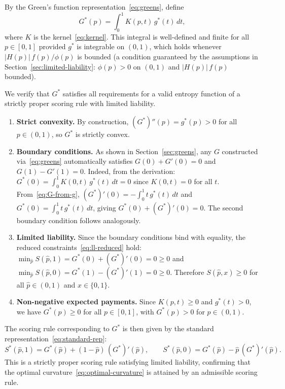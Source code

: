 \documentclass[11pt]{article}
\begin{document}
By the Green's function representation~\eqref{eq:greens}, define
\[
G^*(p) = \int_0^1 K(p,t)\,g^*(t)\,dt,
\]
where $K$ is the kernel~\eqref{eq:kernel}. This integral is well-defined and finite for all $p \in [0,1]$ provided $g^*$ is integrable on $(0,1)$, which holds whenever $|H(p)|\,f(p)/\phi(p)$ is bounded (a condition guaranteed by the assumptions in Section~\ref{sec:limited-liability}: $\phi(p) > 0$ on $(0,1)$ and $|H(p)|\,f(p)$ bounded).

We verify that $G^*$ satisfies all requirements for a valid entropy function of a strictly proper scoring rule with limited liability.

\begin{enumerate}
\item \textbf{Strict convexity.} By construction, $(G^*)''(p) = g^*(p) > 0$ for all $p \in (0,1)$, so $G^*$ is strictly convex.

\item \textbf{Boundary conditions.} As shown in Section~\ref{sec:greens}, any $G$ constructed via~\eqref{eq:greens} automatically satisfies $G(0) + G'(0) = 0$ and $G(1) - G'(1) = 0$. Indeed, from the derivation: $G^*(0) = \int_0^1 K(0,t)\,g^*(t)\,dt = 0$ since $K(0,t) = 0$ for all $t$. From~\eqref{eq:G-from-g}, $(G^*)'(0) = -\int_0^1 t\,g^*(t)\,dt$ and $G^*(0) = \int_0^1 t\,g^*(t)\,dt$, giving $G^*(0) + (G^*)'(0) = 0$. The second boundary condition follows analogously.

\item \textbf{Limited liability.} Since the boundary conditions bind with equality, the reduced constraints~\eqref{eq:ll-reduced} hold: $\min_{\hat{p}} S(\hat{p}, 1) = G^*(0) + (G^*)'(0) = 0 \geq 0$ and $\min_{\hat{p}} S(\hat{p}, 0) = G^*(1) - (G^*)'(1) = 0 \geq 0$. Therefore $S(\hat{p}, x) \geq 0$ for all $\hat{p} \in (0,1)$ and $x \in \{0,1\}$.

\item \textbf{Non-negative expected payments.} Since $K(p,t) \geq 0$ and $g^*(t) > 0$, we have $G^*(p) \geq 0$ for all $p \in [0,1]$, with $G^*(p) > 0$ for $p \in (0,1)$.
\end{enumerate}

The scoring rule corresponding to $G^*$ is then given by the standard representation~\eqref{eq:standard-rep}:
\[
S^*(\hat{p}, 1) = G^*(\hat{p}) + (1-\hat{p})\,(G^*)'(\hat{p}), \qquad S^*(\hat{p}, 0) = G^*(\hat{p}) - \hat{p}\,(G^*)'(\hat{p}).
\]
This is a strictly proper scoring rule satisfying limited liability, confirming that the optimal curvature~\eqref{eq:optimal-curvature} is attained by an admissible scoring rule.
\end{document}
